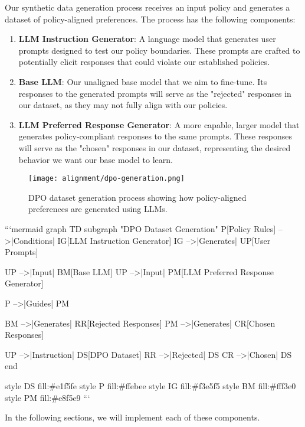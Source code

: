 Our synthetic data generation process receives an input policy and generates a dataset of policy-aligned preferences. The process has the following components:

\begin{enumerate}
\item \textbf{LLM Instruction Generator}: A language model that generates user prompts designed to test our policy boundaries. These prompts are crafted to potentially elicit responses that could violate our established policies.

\item \textbf{Base LLM}: Our unaligned base model that we aim to fine-tune. Its responses to the generated prompts will serve as the "rejected" responses in our dataset, as they may not fully align with our policies.

\item \textbf{LLM Preferred Response Generator}: A more capable, larger model that generates policy-compliant responses to the same prompts. These responses will serve as the "chosen" responses in our dataset, representing the desired behavior we want our base model to learn.
\end{enumerate}

\begin{figure}[H]
\centering
\texttt{[image: alignment/dpo-generation.png]}
\caption{DPO dataset generation process showing how policy-aligned preferences are generated using LLMs.}
\label{fig:dpo-generation}
\end{figure}


```{mermaid}
graph TD
    subgraph "DPO Dataset Generation"
        P[Policy Rules] -->|Conditions| IG[LLM Instruction Generator]
        IG -->|Generates| UP[User Prompts]
        
        UP -->|Input| BM[Base LLM]
        UP -->|Input| PM[LLM Preferred Response Generator]
        
        P -->|Guides| PM
        
        BM -->|Generates| RR[Rejected Responses]
        PM -->|Generates| CR[Chosen Responses]
        
        UP -->|Instruction| DS[DPO Dataset]
        RR -->|Rejected| DS
        CR -->|Chosen| DS
    end
    
    style DS fill:#e1f5fe
    style P fill:#ffebee
    style IG fill:#f3e5f5
    style BM fill:#fff3e0
    style PM fill:#e8f5e9
```

In the following sections, we will implement each of these components.

